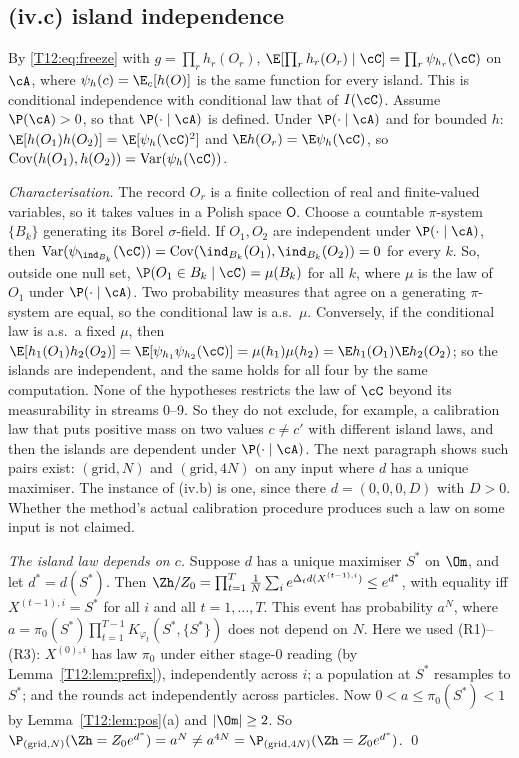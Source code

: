 \documentclass[11pt]{report}
\begin{document}
\subsection{(iv.c) island independence}
By \eqref{T12:eq:freeze} with $g=\prod_rh_r(O_r)$, $\E[\prod_rh_r(O_r)\mid\cC]=\prod_r\psi_{h_r}(\cC)$ on $\cA$, where $\psi_h(c)=\E_c[h(O)]$ is the same function for every island. This is conditional independence with conditional law that of $I(\cC)$. Assume $\P(\cA)>0$, so that $\P(\cdot\mid\cA)$ is defined. Under $\P(\cdot\mid\cA)$ and for bounded $h$: $\E[h(O_1)h(O_2)]=\E[\psi_h(\cC)^2]$ and $\E h(O_r)=\E\psi_h(\cC)$, so $\mathrm{Cov}(h(O_1),h(O_2))=\mathrm{Var}(\psi_h(\cC))$.

\emph{Characterisation.} The record $O_r$ is a finite collection of real and finite-valued variables, so it takes values in a Polish space $\mathsf O$. Choose a countable $\pi$-system $\{B_k\}$ generating its Borel $\sigma$-field. If $O_1,O_2$ are independent under $\P(\cdot\mid\cA)$, then $\mathrm{Var}(\psi_{\ind_{B_k}}(\cC))=\mathrm{Cov}(\ind_{B_k}(O_1),\ind_{B_k}(O_2))=0$ for every $k$. So, outside one null set, $\P(O_1\in B_k\mid\cC)=\mu(B_k)$ for all $k$, where $\mu$ is the law of $O_1$ under $\P(\cdot\mid\cA)$. Two probability measures that agree on a generating $\pi$-system are equal, so the conditional law is a.s.\ $\mu$. Conversely, if the conditional law is a.s.\ a fixed $\mu$, then $\E[h_1(O_1)h_2(O_2)]=\E[\psi_{h_1}\psi_{h_2}(\cC)]=\mu(h_1)\mu(h_2)=\E h_1(O_1)\E h_2(O_2)$; so the islands are independent, and the same holds for all four by the same computation. None of the hypotheses restricts the law of $\cC$ beyond its measurability in streams 0--9. So they do not exclude, for example, a calibration law that puts positive mass on two values $c\ne c'$ with different island laws, and then the islands are dependent under $\P(\cdot\mid\cA)$. The next paragraph shows such pairs exist: $(\text{grid},N)$ and $(\text{grid},4N)$ on any input where $d$ has a unique maximiser. The instance of (iv.b) is one, since there $d=(0,0,0,D)$ with $D>0$. Whether the method's actual calibration procedure produces such a law on some input is not claimed.

\emph{The island law depends on $c$.} Suppose $d$ has a unique maximiser $S^*$ on $\Om$, and let $d^*=d(S^*)$. Then $\Zh/Z_0=\prod_{t=1}^T\frac1N\sum_ie^{\Delta_td(X^{(t-1),i})}\le e^{d^*}$, with equality iff $X^{(t-1),i}=S^*$ for all $i$ and all $t=1,\dots,T$. This event has probability $a^N$, where $a=\pi_0(S^*)\prod_{t=1}^{T-1}K_{\varphi_t}(S^*,\{S^*\})$ does not depend on $N$. Here we used (R1)--(R3): $X^{(0),i}$ has law $\pi_0$ under either stage-0 reading (by Lemma~\ref{T12:lem:prefix}), independently across $i$; a population at $S^*$ resamples to $S^*$; and the rounds act independently across particles. Now $0<a\le\pi_0(S^*)<1$ by Lemma~\ref{T12:lem:pos}(a) and $|\Om|\ge2$. So $\P_{(\text{grid},N)}(\Zh=Z_0e^{d^*})=a^N\ne a^{4N}=\P_{(\text{grid},4N)}(\Zh=Z_0e^{d^*})$. \qed
\end{document}
